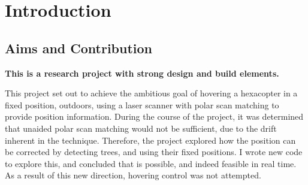 \documentclass[12pt,oneside,a4paper,draft]{book}
\begin{document}
\cleardoublepage
\pagestyle{headings}
\tableofcontents


\cleardoublepage
\pagestyle{headings}
\glsaddall
\printglossaries
\mainmatter

\part{Introduction}
\chapter{Aims and Contribution}
\label{cha:aims}


\textbf{This is a research project with strong design and build elements.}

This project set out to achieve the ambitious goal of hovering a
hexacopter in a fixed position, outdoors, using a laser scanner with
polar scan matching to provide position information. During the course
of the project, it was determined that unaided polar scan matching
would not be sufficient, due to the drift inherent in the
technique. Therefore, the project explored how the position can be
corrected by detecting trees, and using their fixed positions. I wrote
new code to explore this, and concluded that is possible, and indeed
feasible in real time. As a result of this new direction, hovering
control was not attempted.
\end{document}
